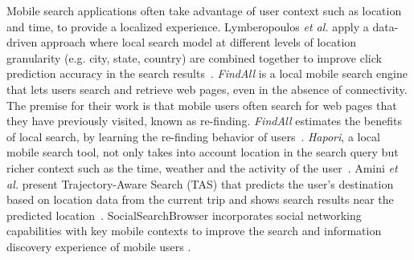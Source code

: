 


Mobile search applications often take advantage of user context such as location and time, to provide a localized experience. Lymberopoulos \textit{et al.} apply a data-driven approach where local search model at different levels of location granularity (e.g. city, state, country) are combined together to improve click prediction accuracy in the search results~\cite{Lymberopoulos:2011}. \textit{FindAll} is a local mobile search engine that lets users search and retrieve web pages, even in the absence of connectivity. The premise for their work is that mobile users often search for web pages that they have previously visited, known as re-finding. \textit{FindAll} estimates the benefits of local search, by learning the re-finding behavior of users~\cite{Balasubramanian:2012}. \textit{Hapori}, a local mobile search tool,  not only takes into account location in the search query but richer context such as the time, weather and the activity of the user~\cite{Lane:2010}. Amini \textit{et al.} present Trajectory-Aware Search (TAS) that predicts the user's destination based on location data from the current trip and shows search results near the predicted location~\cite{Amini:2012}. SocialSearchBrowser incorporates social networking capabilities with key mobile contexts to improve the search and information discovery experience of mobile users \cite{Church:2010}.


